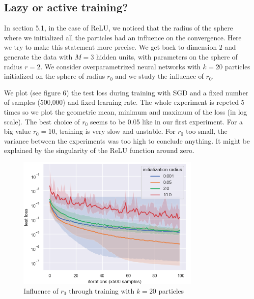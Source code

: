 \documentclass[a4paper, 11pt]{scrartcl}
\begin{document}
{\subsection{Lazy or active training?}

In section 5.1, in the case of ReLU, we noticed that the radius of the sphere where we initialized all the particles had an influence on the convergence. Here we try to make this statement more precise. We get back to dimension 2 and generate the data with $M=3$ hidden units, with parameters on the sphere of radius $r=2$. We consider overparametrized neural networks with $k=20$ particles initialized on the sphere of radius $r_0$ and we study the influence of $r_0$.

We plot (see figure 6) the test loss during training with SGD and a fixed number of samples (500,000) and fixed learning rate. The whole experiment is repeted 5 times so we plot the geometric mean, minimum and maximum of the loss (in log scale). The best choice of $r_0$ seems to be 0.05 like in our first experiment. For a big value $r_0 = 10$, training is very slow and unstable. For $r_0$ too small, the variance between the experiments was too high to conclude anything. It might be explained by the singularity of the ReLU function around zero.

\begin{figure}[h]
\centering
\includegraphics[width=9cm]{radius.png}
  \caption{Influence of $r_0$ through training with $k=20$ particles}
  \label{fig:3}
\end{figure}

}
\end{document}
